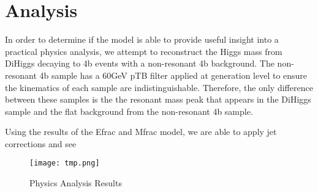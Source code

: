 \section{Analysis}\hfill

In order to determine if the model is able to provide useful insight into a practical physics analysis, we attempt to reconstruct the Higgs mass from DiHiggs decaying to 4b events with a non-resonant 4b background. The non-resonant 4b sample has a 60GeV pTB filter applied at generation level to ensure the kinematics of each sample are indistinguishable. Therefore, the only difference between these samples is the the resonant mass peak that appears in the DiHiggs sample and the flat background from the non-resonant 4b sample.

Using the results of the Efrac and Mfrac model, we are able to apply jet corrections and see 

\begin{figure}[h!]
    \centering
    \texttt{[image: tmp.png]}
    \caption{Physics Analysis Results}
\end{figure}
